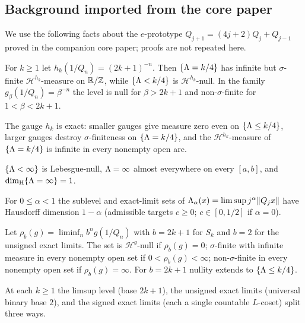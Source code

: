 
\subsection{Background imported from the core paper}\label{sec:prereq}

We use the following facts about the $e$-prototype
$Q_{j+1}=(4j+2)Q_j+Q_{j-1}$ proved in the companion core paper;
proofs are not repeated here.

\begin{theorem}
For $k\ge1$ let $h_k(1/Q_n)=(2k+1)^{-n}$.
Then $\{\Lambda=k/4\}$ has infinite but $\sigma$-finite
$\mathcal{H}^{h_k}$-measure on $\mathbb{R}/\mathbb{Z}$, while
$\{\Lambda<k/4\}$ is $\mathcal{H}^{h_k}$-null.
In the family $g_\beta(1/Q_n)=\beta^{-n}$ the level is null for
$\beta>2k+1$ and non-$\sigma$-finite for $1<\beta<2k+1$.
\end{theorem}

\begin{corollary}
The gauge $h_k$ is exact: smaller gauges give measure zero even on
$\{\Lambda\le k/4\}$, larger gauges destroy $\sigma$-finiteness on
$\{\Lambda=k/4\}$, and the $\mathcal{H}^{h_k}$-measure of
$\{\Lambda=k/4\}$ is infinite in every nonempty open arc.
\end{corollary}

\begin{corollary}
$\{\Lambda<\infty\}$ is Lebesgue-null, $\Lambda=\infty$ almost everywhere on
every $[a,b]$, and $\dim_{\mathrm{H}}\{\Lambda=\infty\}=1$.
\end{corollary}

\begin{theorem}
For $0\le\alpha<1$ the sublevel and exact-limit sets of
$\Lambda_\alpha(x)=\limsup j^\alpha\|Q_jx\|$ have Hausdorff dimension
$1-\alpha$ (admissible targets $c\ge0$; $c\in[0,1/2]$ if $\alpha=0$).
\end{theorem}

\begin{corollary}
Let $\rho_b(g)=\liminf_n b^n g(1/Q_n)$ with $b=2k+1$ for
$S_k$ and $b=2$ for the unsigned exact limits.
The set is $\mathcal{H}^g$-null if $\rho_b(g)=0$;
$\sigma$-finite with infinite measure in every nonempty open set if
$0<\rho_b(g)<\infty$; non-$\sigma$-finite in every nonempty open set
if $\rho_b(g)=\infty$. For $b=2k+1$ nullity extends to
$\{\Lambda\le k/4\}$.
\end{corollary}

\begin{theorem}
At each $k\ge1$ the limsup level (base $2k+1$), the unsigned exact limits
(universal binary base $2$), and the signed exact limits (each a single
countable $L$-coset) split three ways.
\end{theorem}
